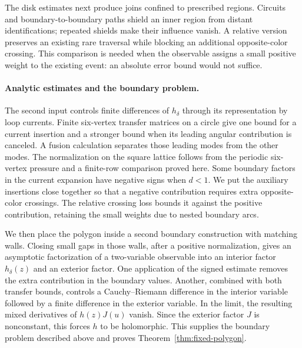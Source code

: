 The disk estimates next produce joins confined to prescribed regions.
Circuits and boundary-to-boundary paths shield an inner region from
distant identifications; repeated shields make their influence vanish.
A relative version preserves an existing rare traversal while blocking
an additional opposite-color crossing. This comparison is needed when
the observable assigns a small positive weight to the existing event:
an absolute error bound would not suffice.

\paragraph{Analytic estimates and the boundary problem.}
The second input controls finite differences of $h_\delta$ through its
representation by loop currents. Finite six-vertex transfer matrices
on a circle give one bound for a current insertion and a stronger bound
when its leading angular contribution is canceled. A fusion calculation
separates those leading modes from the other modes. The normalization
on the square lattice follows from the periodic six-vertex pressure
\cite[Theorem~1]{SixVertex2022} and a finite-row comparison proved here.
Some boundary factors in the current expansion have negative signs
when $d<1$. We put the auxiliary insertions close together so that a
negative contribution requires extra opposite-color crossings. The
relative crossing loss bounds it against the positive contribution,
retaining the small weights due to nested boundary arcs.

We then place the polygon inside a second boundary construction with
matching walls. Closing small gaps in those walls, after a positive
normalization, gives an asymptotic factorization of a two-variable
observable into an interior factor $h_\delta(z)$ and an exterior factor.
One application of the signed estimate removes the extra contribution
in the boundary values.
Another, combined with both transfer bounds, controls a
Cauchy--Riemann difference in the interior variable followed by a
finite difference in the exterior variable. In the limit, the
resulting mixed derivatives of $h(z)J(u)$ vanish. Since the exterior
factor $J$ is nonconstant, this forces $h$ to be holomorphic.
This supplies the boundary problem described above and
proves Theorem~\ref{thm:fixed-polygon}.


